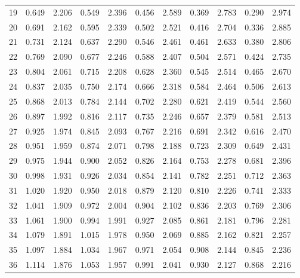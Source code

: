 \documentclass[12pt]{article}
\begin{document}
\begin{table}
\begin{center}
{\begin{tabular}{|c|c|c|c|c|c|c|c|c|c|c|}
19&0.649&2.206&0.549&2.396&0.456&2.589&0.369&2.783&0.290&
2.974\\


20&0.691&2.162&0.595&2.339&0.502&2.521&0.416&2.704&0.336&2.885\\


21&0.731&2.124&
0.637&2.290&0.546&2.461&0.461&2.633&0.380&2.806\\


22&0.769&2.090&0.677&2.246&
0.588&2.407&0.504&2.571&0.424&2.735\\


23&0.804&2.061&0.715&2.208&0.628&2.360&
0.545&2.514&0.465&2.670\\


24&0.837&2.035&0.750&2.174&0.666&2.318&0.584&2.464&
0.506&2.613\\


25&0.868&2.013&0.784&2.144&0.702&2.280&0.621&2.419& 0.544&2.560\\


26&0.897&
1.992&0.816&2.117&0.735&2.246&0.657&2.379&0.581&2.513\\


27&0.925&1.974&0.845&
2.093&0.767&2.216&0.691&2.342&0.616&2.470\\


28&0.951&1.959&0.874&2.071&0.798&
2.188&0.723&2.309&0.649&2.431\\


29&0.975&1.944&0.900&2.052&0.826&2.164&0.753&
2.278&0.681&2.396\\

30&0.998&1.931&0.926&2.034&0.854&2.141&0.782&2.251&0.712&
2.363\\


31&1.020&1.920&0.950&2.018&0.879&2.120&0.810&2.226&0.741&2.333\\


32&1.041&1.909&
0.972&2.004&0.904&2.102&0.836&2.203&0.769&2.306\\


33&1.061&1.900&0.994&1.991&
0.927&2.085&0.861&2.181&0.796&2.281\\


34&1.079&1.891&1.015&1.978&0.950&2.069&
0.885&2.162&0.821&2.257\\


35&1.097&1.884&1.034&1.967&0.971&2.054&0.908&2.144&
0.845&2.236\\


36&1.114&1.876&1.053&1.957&0.991&2.041&0.930&2.127&0.868&2.216\\



\end{tabular}}
\end{center}
\end{table}
\end{document}
